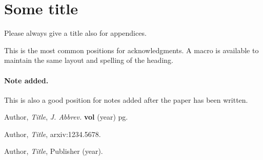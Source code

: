 \documentclass[a4paper,11pt]{article}
\begin{document}
\appendix
\section{Some title}
Please always give a title also for appendices.





\acknowledgments

This is the most common positions for acknowledgments. A macro is
available to maintain the same layout and spelling of the heading.

\paragraph{Note added.} This is also a good position for notes added
after the paper has been written.






\begin{thebibliography}{99}

Author, \emph{Title}, \emph{J. Abbrev.} {\bf vol} (year) pg.

Author, \emph{Title},
arxiv:1234.5678.

Author, \emph{Title},
Publisher (year).





\end{thebibliography}
\end{document}
